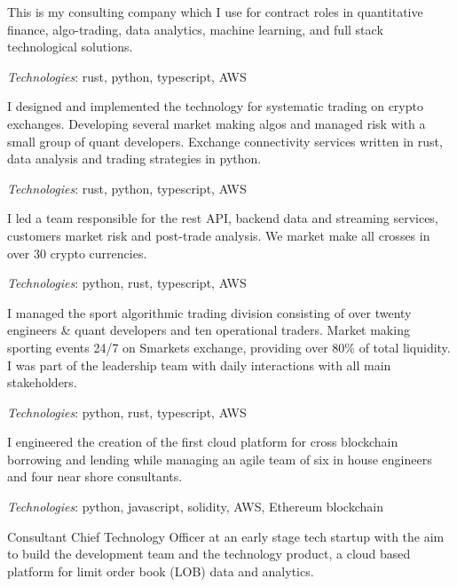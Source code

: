 
This is my consulting company which I use for contract roles in quantitative finance,
algo-trading, data analytics, machine learning, and full stack technological solutions.

{\it Technologies}: rust, python, typescript, AWS


I designed and implemented the technology for systematic trading on crypto exchanges.
Developing several market making algos and managed risk with a small group of quant developers.
Exchange connectivity services written in rust, data analysis and trading strategies in python.

{\it Technologies}: rust, python, typescript, AWS


I led a team responsible for the rest API,
backend data and streaming services, customers market risk and post-trade analysis.
We market make all crosses in over 30 crypto currencies.

{\it Technologies}: python, rust, typescript, AWS


I managed the sport algorithmic trading division consisting of over twenty engineers \& quant developers and ten operational traders.
Market making sporting events 24/7 on Smarkets exchange, providing over 80\% of total liquidity.
I was part of the leadership team with daily interactions with all main stakeholders.

{\it Technologies}: python, rust, typescript, AWS


I engineered the creation of the first cloud platform for cross blockchain borrowing and lending
while managing an agile team of six in house engineers and four near shore consultants.

{\it Technologies}: python, javascript, solidity, AWS, Ethereum blockchain



Consultant Chief Technology Officer at an early stage tech startup with the aim to build the development team and the technology product,
a cloud based platform for limit order book (LOB) data and analytics.

